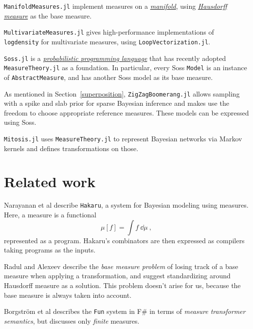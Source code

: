 \documentclass{juliacon}
\begin{document}
\verb|ManifoldMeasures.jl|\cite{manifoldmeasures} implement measures on a \href{https://en.wikipedia.org/wiki/Manifold}{\emph{manifold}}, using \href{https://en.wikipedia.org/wiki/Hausdorff_measure}{\emph{Hausdorff measure}} as the base measure.

\verb|MultivariateMeasures.jl|\cite{multivariatemeasures} gives high-performance implementations of \verb|logdensity| for multivariate measures, using \verb|LoopVectorization.jl|\cite{loopvectorization}.

\verb|Soss.jl|\cite{scherrer2020soss} is a \href{https://en.wikipedia.org/wiki/Probabilistic_programming}{\emph{probabilistic programming language}} that has recently adopted \verb|MeasureTheory.jl| as a foundation. In particular, every Soss \verb|Model| is an instance of \verb|AbstractMeasure|, and has another Soss model as its base measure.

As mentioned in Section~\ref{superposition}, \verb|ZigZagBoomerang.jl|\cite{https://doi.org/10.5281/zenodo.3931118} allows sampling with a spike and slab prior for sparse Bayesian inference and makes use the freedom to choose appropriate reference measures.  These models can be expressed using Soss.

\verb|Mitosis.jl|\cite{arxiv2010.03509} uses \verb|MeasureTheory.jl| to represent Bayesian networks via Markov kernels and defines transformations on those.



\section{Related work}

Narayanan et al \cite{narayanan2016probabilistic} describe \verb|Hakaru|, a system for Bayesian modeling using measures. Here, a measure is a functional
\[
\mu[f] = \int f\ \dd\mu\ ,
\]
represented as a program. Hakaru's combinators are then expressed as compilers taking programs as the inputs.

Radul and Alexeev \cite{Radul2020} describe the \emph{base measure problem} of losing track of a base measure when applying a transformation, and suggest standardizing around Hausdorff measure as a solution. This problem doesn't arise for us, because the base measure is always taken into account.

Borgstr\"om et al \cite{Borgstr_m_2013} describes the \verb|Fun| system in F\# in terms of \emph{measure transformer semantics}, but discusses only \emph{finite} measures.
\end{document}

